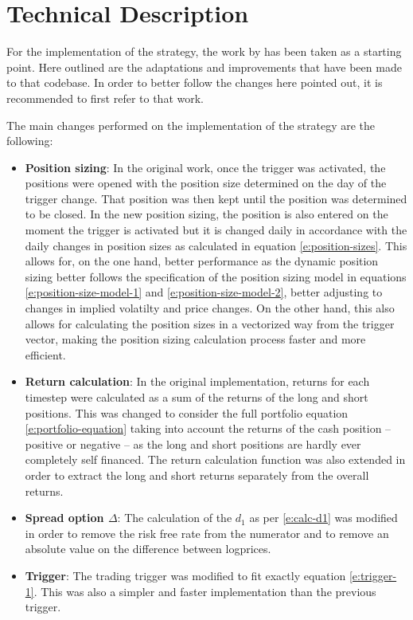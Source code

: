 \section{Technical Description}
For the implementation of the strategy, the work by \cite{gallego_2023} has been taken as a starting point. Here outlined are the adaptations and improvements that have been made to that codebase. In order to better follow the changes here pointed out, it is recommended to first refer to that work.

The main changes performed on the implementation of the strategy are the following:

\begin{itemize}
    \item \textbf{Position sizing}: In the original work, once the trigger was activated, the positions were opened with the position size determined on the day of the trigger change. That position was then kept until the position was determined to be closed. In the new position sizing, the position is also entered on the moment the trigger is activated but it is changed daily in accordance with the daily changes in position sizes as calculated in equation \eqref{e:position-sizes}. This allows for, on the one hand, better performance as the dynamic position sizing better follows the specification of the position sizing model in equations \eqref{e:position-size-model-1} and \eqref{e:position-size-model-2}, better adjusting to changes in implied volatilty and price changes. On the other hand, this also allows for calculating the position sizes in a vectorized way from the trigger vector, making the position sizing calculation process faster and more efficient. 
    \item \textbf{Return calculation}: In the original implementation, returns for each timestep were calculated as a sum of the returns of the long and short positions. This was changed to consider the full portfolio equation \eqref{e:portfolio-equation} taking into account the returns of the cash position -- positive or negative -- as the long and short positions are hardly ever completely self financed. The return calculation function was also extended in order to extract the long and short returns separately from the overall returns. 
    \item \textbf{Spread option $\Delta$}: The calculation of the $d_1$ as per \eqref{e:calc-d1} was modified in order to remove the risk free rate from the numerator and to remove an absolute value on the difference between logprices. 
    \item \textbf{Trigger}: The trading trigger was modified to fit exactly equation \eqref{e:trigger-1}. This was also a simpler and faster implementation than the previous trigger. 

\end{itemize}
